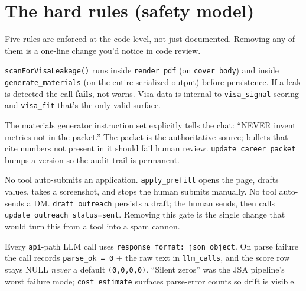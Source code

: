 \documentclass[11pt,letterpaper]{article}
\newcommand{\tool}[1]{\texttt{#1}}
\begin{document}
\section{The hard rules (safety model)}

Five rules are enforced at the code level, not just documented. Removing any of them is a one-line change you'd notice in code review.

\begin{warnbox}
\texttt{scanForVisaLeakage()} runs inside \tool{render\_pdf} (on \texttt{cover\_body}) and inside \tool{generate\_materials} (on the entire serialized output) before persistence. If a leak is detected the call \textbf{fails}, not warns. Visa data is internal to \tool{visa\_signal} scoring and \texttt{visa\_fit} \textemdash{} that's the only valid surface.
\end{warnbox}

\begin{warnbox}
The materials generator instruction set explicitly tells the chat: ``NEVER invent metrics not in the packet.'' The packet is the authoritative source; bullets that cite numbers not present in it should fail human review. \tool{update\_career\_packet} bumps a version so the audit trail is permanent.
\end{warnbox}

\begin{warnbox}
No tool auto-submits an application. \tool{apply\_prefill} opens the page, drafts values, takes a screenshot, and stops \textemdash{} the human submits manually. No tool auto-sends a DM. \tool{draft\_outreach} persists a draft; the human sends, then calls \tool{update\_outreach status=sent}. Removing this gate is the single change that would turn this from a tool into a spam cannon.
\end{warnbox}

\begin{warnbox}
Every \texttt{api}-path LLM call uses \texttt{response\_format: json\_object}. On parse failure the call records \texttt{parse\_ok = 0} + the raw text in \texttt{llm\_calls}, and the score row stays NULL \textemdash{} \emph{never} a default \texttt{(0,0,0,0)}. ``Silent zeros'' was the JSA pipeline's worst failure mode; \tool{cost\_estimate} surfaces parse-error counts so drift is visible.
\end{warnbox}
\end{document}
